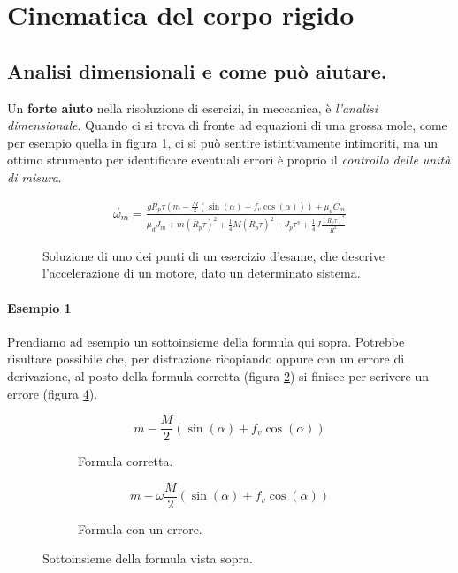 \documentclass[main.tex]{subfiles}
\begin{document}
\section{Cinematica del corpo rigido}

\subsection{Analisi dimensionali e come può aiutare.}
Un \textbf{forte aiuto} nella risoluzione di esercizi, in meccanica, è \textit{l'analisi dimensionale}. Quando ci si trova di fronte ad equazioni di una grossa mole, come per esempio quella in figura \ref{big_equation}, ci si può sentire istintivamente intimoriti, ma un ottimo strumento per identificare eventuali errori è proprio il \textit{controllo delle unità di misura}.

\begin{figure}[H]
  \begin{equation}
\begin{split}
\dot{\omega_m} = \frac{gR_p\tau(m -\frac{M}{2}(\sin(\alpha) + f_v\cos(\alpha))) + \mu_{d}C_m}{\mu_{d}J_m  + m(R_p\tau)^2 + \frac{1}{4}M(R_p\tau)^2 + J_p \tau^2 + \frac{1}{4}J \frac{(R_p\tau)^2}{R^2}}
\end{split}
\end{equation}
\caption{Soluzione di uno dei punti di un esercizio d'esame, che descrive l'accelerazione di un motore, dato un determinato sistema.}
\label{big_equation}
\end{figure}

\paragraph{Esempio 1}
Prendiamo ad esempio un sottoinsieme della formula qui sopra. Potrebbe risultare possibile che, per distrazione ricopiando oppure con un errore di derivazione, al posto della formula corretta (figura \ref{formula_corretta_1}) si finisce per scrivere un errore (figura \ref{formula_sbagliata_1}).

\begin{figure}[H]
  \begin{subfigure}[b]{.5\textwidth}
  \centering
  \[
  m -\frac{M}{2}(\sin(\alpha) + f_v\cos(\alpha))
  \]
  \caption{Formula corretta.}
  \label{formula_corretta_1}
  \end{subfigure}
  \hfill
  \begin{subfigure}[b]{.5\textwidth}
  \centering
  \[
  m -\omega\frac{M}{2}(\sin(\alpha) + f_v\cos(\alpha))
  \]
  \caption{Formula con un errore.}
  \label{formula_sbagliata_1}
  \end{subfigure}
  \caption{Sottoinsieme della formula vista sopra.}
\end{figure}
\end{document}
